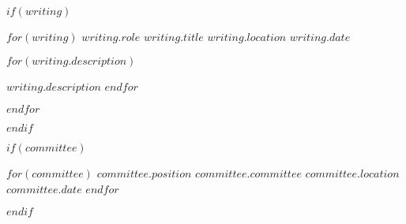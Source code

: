 \documentclass[11pt, a4paper]{awesome-cv}
\begin{document}

    $if(writing)$

    \begin{cventries}
        $for(writing)$
        \cventry
        {$writing.role$} %
        {$writing.title$} %
        {$writing.location$} %
        {$writing.date$} %
        {
        \begin{cvitems}
            $for(writing.description)$
            \item {$writing.description$}
            $endfor$
        \end{cvitems}
        }
        $endfor$
    \end{cventries}
    $endif$


    $if(committee)$

    \begin{cvhonors}
        $for(committee)$
        \cvhonor
        {$committee.position$} %
        {$committee.committee$} %
        {$committee.location$} %
        {$committee.date$} %
        $endfor$
    \end{cvhonors}
    $endif$
\end{document}
